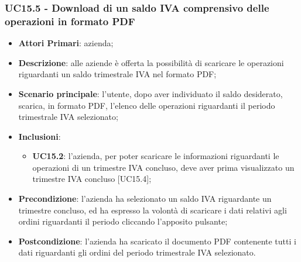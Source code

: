 \subsubsection{UC15.5 - Download di un saldo IVA comprensivo delle operazioni in formato PDF}
\begin{itemize}
	\item \textbf{Attori Primari}: azienda;
	\item \textbf{Descrizione}: alle aziende è offerta la possibilità di scaricare le operazioni riguardanti un saldo trimestrale IVA nel formato PDF;
	\item \textbf{Scenario principale}: l'utente, dopo aver individuato il saldo desiderato, scarica, in formato PDF, l'elenco delle operazioni riguardanti il periodo trimestrale IVA selezionato;
	\item \textbf{Inclusioni}:
	\begin{itemize}
		\item \textbf{UC15.2}: l'azienda, per poter scaricare le informazioni riguardanti le operazioni di un trimestre IVA concluso, deve aver prima visualizzato un trimestre IVA concluso [UC15.4];
	\end{itemize}
	\item \textbf{Precondizione}: l'azienda ha selezionato un saldo IVA riguardante un trimestre concluso, ed ha espresso la volontà di scaricare i dati relativi agli ordini riguardanti il periodo cliccando l'apposito pulsante;
	\item \textbf{Postcondizione}: l'azienda ha scaricato il documento PDF contenente tutti i dati riguardanti gli ordini del periodo trimestrale IVA selezionato.
\end{itemize} 

